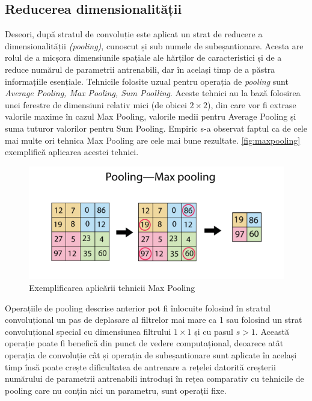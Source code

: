 \subsection*{Reducerea dimensionalității}
Deseori, după stratul de convoluție este aplicat un strat de reducere a dimensionalității \textit{(pooling)}, cunoscut și sub numele de subeșantionare. Acesta are rolul de a micșora dimensiunile spațiale ale hărților de caracteristici și de a reduce numărul de parametrii antrenabili, dar în același timp de a păstra informațiile esențiale. Tehnicile folosite uzual pentru operația de \textit{pooling} sunt \textit{Average Pooling, Max Pooling, Sum Poolling}. Aceste tehnici au la bază folosirea unei ferestre de dimensiuni relativ mici (de obicei $2\times2$), din care vor fi extrase valorile maxime în cazul Max Pooling, valorile medii pentru Average Pooling și suma tuturor valorilor pentru Sum Pooling. Empiric s-a observat faptul ca de cele mai multe ori tehnica Max Pooling are cele mai bune rezultate. \autoref{fig:maxpooling} exemplifică aplicarea acestei tehnici.
\begin{figure}[ht]
\centering
\includegraphics[width=\textwidth, keepaspectratio]{fig/cap2/poolingmax.png}
\caption{Exemplificarea aplicării tehnicii Max Pooling \cite{online:pooling}}
\label{fig:maxpooling}
\end{figure}

Operațiile de pooling descrise anterior pot fi înlocuite folosind în stratul convoluțional un pas de deplasare al filtrelor mai mare ca 1 sau folosind un strat convoluțional special cu dimensiunea filtrului $1\times1$ și cu pasul $s>1$. Această operație poate fi benefică din punct de vedere computațional, deoarece atât operația de convoluție cât și operația de subeșantionare sunt aplicate în același timp însă poate crește dificultatea de antrenare a rețelei datorită creșterii numărului de parametrii antrenabili introduși în rețea comparativ cu tehnicile de pooling care nu conțin nici un parametru, sunt operații fixe.

